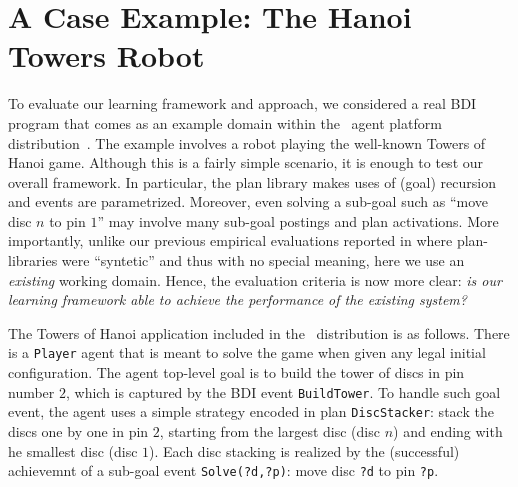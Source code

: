 \section{A Case Example: The Hanoi Towers Robot}\label{sec:hanoi}

\newcommand{\entity}[1]{\texttt{#1}}

To evaluate our learning framework and approach, we considered a real BDI program
that comes as an example domain within the \JACK\ agent platform
distribution~\cite{BusettaRHL:AL99-JACK}.
The example involves a robot playing the well-known Towers of Hanoi game.
Although this is a fairly simple scenario, it is enough to test our overall
framework. In particular, the plan library makes uses of (goal) recursion and
events are parametrized. Moreover, even solving a sub-goal such as ``move disc
$n$ to pin $1$'' may involve many sub-goal postings and plan activations.
More importantly, unlike our previous empirical evaluations reported in
\cite{Airiau:IJAT:09,Singh:AAMAS10} where plan-libraries were ``syntetic'' and
thus with no special meaning, here we use an \emph{existing} working domain.
Hence, the evaluation criteria is now more clear: \emph{is our learning framework
able to achieve the performance of the existing system?}


The Towers of Hanoi application included in the \JACK\ distribution is as
follows.
There is a \entity{Player} agent that is meant to solve the game when given any
legal initial configuration.
The agent top-level goal is to build the tower of discs in pin number $2$, which
is captured by the BDI event \entity{BuildTower}.
To handle such goal event, the agent uses a simple strategy encoded in plan
\entity{DiscStacker}: stack the discs one by one in pin $2$, starting from the
largest disc (disc $n$) and ending with he smallest disc (disc $1$). Each disc
stacking is realized by the (successful) achievemnt of a sub-goal event
\entity{Solve(?d,?p)}: move disc \entity{?d} to pin \entity{?p}.

